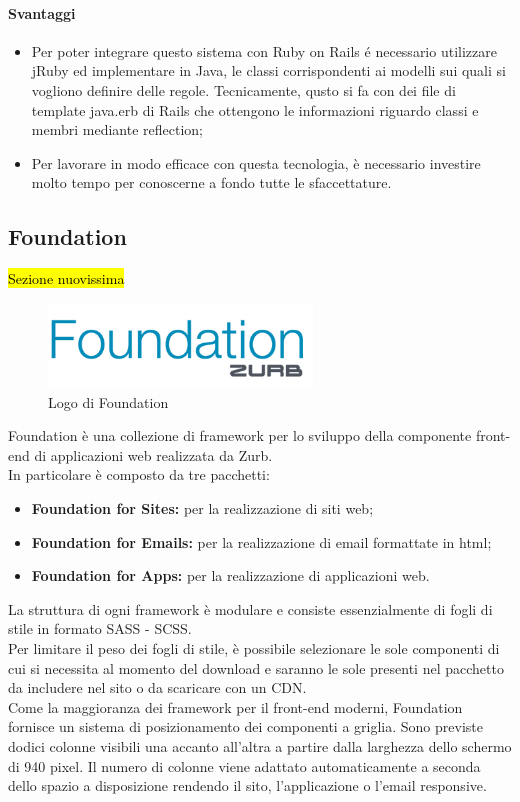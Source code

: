 \paragraph{Svantaggi}
	\begin{itemize}
		\item Per poter integrare questo sistema con Ruby on Rails é necessario utilizzare jRuby ed implementare in Java, le classi corrispondenti ai modelli sui quali si vogliono definire delle regole. Tecnicamente, qusto si fa con dei file di template java.erb di Rails che ottengono le informazioni riguardo classi e membri mediante \gls{reflection};
		\item Per lavorare in modo efficace con questa tecnologia, è necessario investire molto tempo per conoscerne a fondo tutte le sfaccettature.
	\end{itemize}
\subsection{Foundation}
	\hl{Sezione nuovissima}
		\begin{figure}[H]
			\begin{center}
				\includegraphics[width=7cm]{Pics/logo-foundation.png}
				\caption{Logo di Foundation}
				\label{fig:FoundationLogo}
			\end{center}
		\end{figure}
	Foundation è una collezione di \gls{framework} per lo sviluppo della componente \gls{front-end} di applicazioni web realizzata da Zurb. \\ In particolare è composto da tre pacchetti:
	\begin{itemize}
		\item \textbf{Foundation for Sites: } per la realizzazione di siti web;
		\item \textbf{Foundation for Emails: } per la realizzazione di email formattate in html;
		\item \textbf{Foundation for Apps: } per la realizzazione di applicazioni web.
	\end{itemize}
	La struttura di ogni \gls{framework} è modulare e consiste essenzialmente di fogli di stile in formato \gls{SASS} - \gls{SCSS}. \\
	Per limitare il peso dei fogli di stile, è possibile selezionare  le sole componenti di cui si necessita al momento del download e saranno le sole presenti nel pacchetto da includere nel sito o da scaricare con un \gls{CDN}. \\
	Come la maggioranza dei framework per il \gls{front-end} moderni, Foundation fornisce un sistema di posizionamento dei componenti a griglia. Sono previste dodici colonne visibili una accanto all'altra a partire dalla larghezza dello schermo di 940 pixel. Il numero di colonne viene adattato automaticamente a seconda dello spazio a disposizione rendendo il sito, l'applicazione o l'email responsive. 
